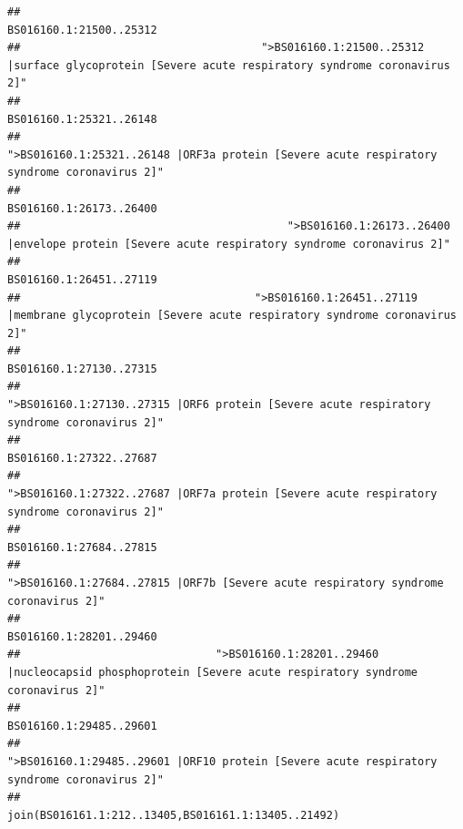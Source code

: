\documentclass[
]{article}
\begin{document}
\begin{verbatim}
##                                                                                                                BS016160.1:21500..25312 
##                                     ">BS016160.1:21500..25312 |surface glycoprotein [Severe acute respiratory syndrome coronavirus 2]" 
##                                                                                                                BS016160.1:25321..26148 
##                                            ">BS016160.1:25321..26148 |ORF3a protein [Severe acute respiratory syndrome coronavirus 2]" 
##                                                                                                                BS016160.1:26173..26400 
##                                         ">BS016160.1:26173..26400 |envelope protein [Severe acute respiratory syndrome coronavirus 2]" 
##                                                                                                                BS016160.1:26451..27119 
##                                    ">BS016160.1:26451..27119 |membrane glycoprotein [Severe acute respiratory syndrome coronavirus 2]" 
##                                                                                                                BS016160.1:27130..27315 
##                                             ">BS016160.1:27130..27315 |ORF6 protein [Severe acute respiratory syndrome coronavirus 2]" 
##                                                                                                                BS016160.1:27322..27687 
##                                            ">BS016160.1:27322..27687 |ORF7a protein [Severe acute respiratory syndrome coronavirus 2]" 
##                                                                                                                BS016160.1:27684..27815 
##                                                    ">BS016160.1:27684..27815 |ORF7b [Severe acute respiratory syndrome coronavirus 2]" 
##                                                                                                                BS016160.1:28201..29460 
##                              ">BS016160.1:28201..29460 |nucleocapsid phosphoprotein [Severe acute respiratory syndrome coronavirus 2]" 
##                                                                                                                BS016160.1:29485..29601 
##                                            ">BS016160.1:29485..29601 |ORF10 protein [Severe acute respiratory syndrome coronavirus 2]" 
##                                                                                    join(BS016161.1:212..13405,BS016161.1:13405..21492) 

\end{verbatim}
\end{document}
